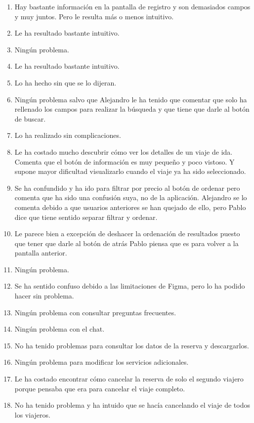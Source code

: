 \begin{enumerate}
    \item Hay bastante información en la pantalla de registro y son demasiados campos y muy juntos. Pero le resulta más o menos intuitivo.
    \item Le ha resultado bastante intuitivo.
    \item Ningún problema.
    \item Le ha resultado bastante intuitivo.
    \item Lo ha hecho sin que se lo dijeran.
    \item Ningún problema salvo que Alejandro le ha tenido que comentar que solo ha rellenado los campos para realizar la búsqueda y que tiene que darle al botón de buscar.
    \item Lo ha realizado sin complicaciones.
    \item Le ha costado mucho descubrir cómo ver los detalles de un viaje de ida. Comenta que el botón de información es muy pequeño y poco vistoso. Y supone mayor dificultad visualizarlo cuando el viaje ya ha sido seleccionado.
    \item Se ha confundido y ha ido para filtrar por precio al botón de ordenar pero comenta que ha sido una confusión suya, no de la aplicación. Alejandro se lo comenta debido a que usuarios anteriores se han quejado de ello, pero Pablo dice que tiene sentido separar filtrar y ordenar.
    \item Le parece bien a excepción de deshacer la ordenación de resultados puesto que tener que darle al botón de atrás Pablo piensa que es para volver a la pantalla anterior.
    \item Ningún problema.
    \item Se ha sentido confuso debido a las limitaciones de Figma, pero lo ha podido hacer sin problema.
    \item Ningún problema con consultar preguntas frecuentes.
    \item Ningún problema con el chat.
    \item No ha tenido problemas para consultar los datos de la reserva y descargarlos.
    \item Ningún problema para modificar los servicios adicionales.
    \item Le ha costado encontrar cómo cancelar la reserva de solo el segundo viajero porque pensaba que era para cancelar el viaje completo.
    \item No ha tenido problema y ha intuido que se hacía cancelando el viaje de todos los viajeros.
\end{enumerate}


